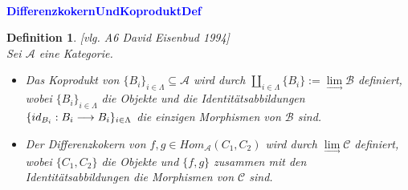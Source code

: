 \documentclass[10pt,a4paper]{report}
\newcommand{\ModulsOfDifferenzials}{David Eisenbud 1994}
\newcounter{Aussage}[chapter]
\newtheorem{definition}[Aussage]{Definition}
\newcommand{\functionfront}[3]{\nolinebreak{#1:#2 \longrightarrow #3}}
\newcommand{\colimes}[0]{\lim\limits_{ \longrightarrow }}
\begin{document}
\ \\
\textcolor{blue}{\textbf{DifferenzkokernUndKoproduktDef}}
\begin{definition}\label{DifferenzkokernUndKoproduktDef} \textit{[vlg. A6 \ModulsOfDifferenzials]}\\
Sei $\mathcal{A}$ eine Kategorie.
\begin{itemize}
\item Das Koprodukt von $ \lbrace B_i \rbrace_{i \in \Lambda} \subseteq \mathcal{A}$ wird durch $\coprod_{i \in \Lambda} \lbrace B_i \rbrace := \colimes\mathcal{B}$ definiert, wobei $\lbrace B_i \rbrace_{i \in \Lambda}$ die Objekte und die Identitätsabbildungen $\lbrace \functionfront{id_{B_i}}{B_i}{B_i} \rbrace_{i \in \Lambda}$ die einzigen Morphismen von $\mathcal{B}$ sind.
\item Der Differenzkokern von $f,g \in Hom_{\mathcal{A}}(C_1,C_2)$ wird durch $\colimes \mathcal{C}$ definiert,
wobei $\lbrace C_1,C_2 \rbrace$ die Objekte und $ \lbrace f,g \rbrace$ zusammen mit den Identitätsabbildungen die Morphismen von $\mathcal{C}$ sind.
\end{itemize}
\end{definition}
\end{document}
